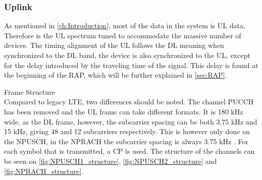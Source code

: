 \subsubsection{Uplink}
\label{sec:ULphy}
As mentioned in \autoref{ch:Introduction}, most of the data in the system is \gls{UL} data. Therefore is the \gls{UL} spectrum tuned to accommodate the massive number of devices. The timing alignment of the \gls{UL} follows the \gls{DL} meaning when synchronized to the \gls{DL} band, the device is also synchronized to the \gls{UL}, except for the delay introduced by the traveling time of the signal. This delay is found at the beginning of the \gls{RAP}, which will be further explained in \autoref{sec:RAP}. 

Frame Structure\\
Compared to legacy \gls{LTE}, two differences should be noted. The channel \gls{PUCCH} has been removed and the \gls{UL} frame can take different formats. It is 180 kHz wide, as the \gls{DL} frame, however, the subcarrier spacing can be both 3.75 kHz and 15 kHz, giving 48 and 12 subcarriers respectively. This is however only done on the \gls{NPUSCH}, in the \gls{NPRACH} the subcarrier spacing is always 3.75 kHz \citep{NB-IoT_Book}. For each symbol that is transmitted, a \gls{CP} is used. The structure of the channels can be seen on \autoref{fig:NPUSCH1_structure}, \autoref{fig:NPUSCH2_structure} and \autoref{fig:NPRACH_structure}.

